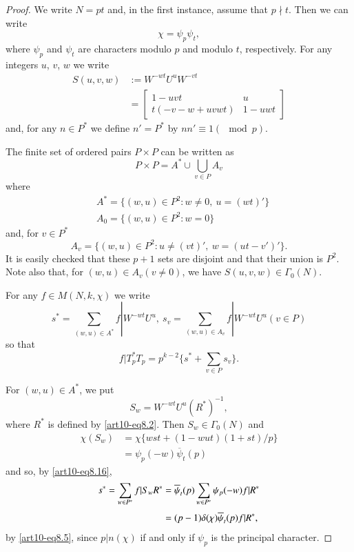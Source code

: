 \begin{proof}
We write $N=pt$ and, in the first instance, assume that $p\nmid t$. Then we can write
$$
\chi=\psi_{p}\psi_{t},
$$
where $\psi_{p}$ and $\psi_{t}$ are characters modulo $p$ and modulo $t$, respectively. For any integers $u$, $v$, $w$ we write
\begin{align}
S(u,v,w) &:= W^{-wt}U^{u}W^{-vt}\label{art10-eq8.10}\\[3pt]
 &= 
\begin{bmatrix}
1-uvt & u\\
t(-v-w+uvwt) & 1-uwt
\end{bmatrix}\label{art10-eq8.11}
\end{align}
and, for any $n\in P^{*}$ we define $n'=P^{*}$ by $nn'\equiv 1(\mod p)$.

The finite set of ordered pairs $P\times P$ can be written as
\begin{equation}
P\times P=A^{*}\cup\bigcup\limits_{v\in P}A_{v}\label{art10-eq8.12}
\end{equation}
where
\begin{align}
& A^{*}=\{(w,u)\in P^{2}:w\neq 0, \ u=(wt)'\}\label{art10-eq8.13}\\[3pt]
& A_{0}=\{(w,u)\in P^{2}:w=0\}\label{art10-eq8.14}
\end{align}
and, for $v\in P^{*}$
\begin{equation}
A_{v}=\{(w,u)\in P^{2}:u\neq (vt)', \ w=(ut-v')'\}.\label{art10-eq8.15}
\end{equation}
It is easily checked that these $p+1$ sets are disjoint and that their union is $P^{2}$. Note also that, for $(w,u)\in A_{v}(v\neq 0)$, we have $S(u,v,w)\in \Gamma_{0}(N)$.

For any $f\in M(N,k,\chi)$ we write
\begin{equation}
s^{*}=\sum\limits_{(w,u)\in A^{*}}f|W^{-wt}U^{u}, \ s_{v}=\sum\limits_{(w,u)\in A_{v}}f|W^{-wt}U^{u}(v\in P)\label{art10-eq8.16}
\end{equation}
so that
$$
f|T^{*}_{p}T_{p}=p^{k-2}\{s^{*}+\sum\limits_{v\in P}s_{v}\}.
$$

For $(w,u)\in A^{*}$, we put
\begin{equation}
S_{w}=W^{-wt}U^{u}(R^{*})^{-1},\label{art10-eq8.17}
\end{equation}
where $R^{*}$ is defined by \eqref{art10-eq8.2}. Then $S_{w}\in \Gamma_{0}(N)$ and 
\begin{align*}
\chi(S_{w}) &= \chi\{wst+(1-wut)(1+st)/p\}\\[3pt]
&= \psi_{p}(-w)\overline{\psi}_{t}(p)
\end{align*}\pageoriginale
and so, by \eqref{art10-eq8.16},
\begin{align}
s^{*}=\sum\limits_{w\in P^{*}}f|S_{w}R^{*} &= \overline{\psi}_{t}(p)\sum\limits_{w\in P^{*}}\psi_{p}(-w)f|R^{*}\notag\\[3pt]
&= (p-1)\delta(\chi)\overline{\psi}_{t}(p)f|R^{*},\label{art10-eq8.18}
\end{align}
by \eqref{art10-eq8.5}, since $p|n(\chi)$ if and only if $\psi_{p}$ is the principal character.


\end{proof}
